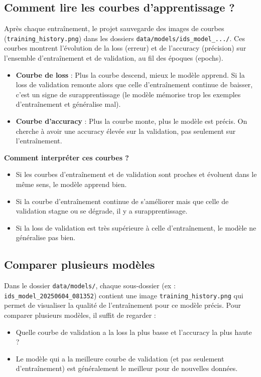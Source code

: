 \documentclass[a4paper,12pt]{article}
\begin{document}
\subsection{Comment lire les courbes d'apprentissage ?}
Après chaque entraînement, le projet sauvegarde des images de courbes (\texttt{training\_history.png}) dans les dossiers \texttt{data/models/ids\_model\_.../}. Ces courbes montrent l'évolution de la loss (erreur) et de l'accuracy (précision) sur l'ensemble d'entraînement et de validation, au fil des époques (epochs).

\begin{itemize}
  \item \textbf{Courbe de loss} : Plus la courbe descend, mieux le modèle apprend. Si la loss de validation remonte alors que celle d'entraînement continue de baisser, c'est un signe de surapprentissage (le modèle mémorise trop les exemples d'entraînement et généralise mal).
  \item \textbf{Courbe d'accuracy} : Plus la courbe monte, plus le modèle est précis. On cherche à avoir une accuracy élevée sur la validation, pas seulement sur l'entraînement.
\end{itemize}

\textbf{Comment interpréter ces courbes ?}
\begin{itemize}
  \item Si les courbes d'entraînement et de validation sont proches et évoluent dans le même sens, le modèle apprend bien.
  \item Si la courbe d'entraînement continue de s'améliorer mais que celle de validation stagne ou se dégrade, il y a surapprentissage.
  \item Si la loss de validation est très supérieure à celle d'entraînement, le modèle ne généralise pas bien.
\end{itemize}

\subsection{Comparer plusieurs modèles}
Dans le dossier \texttt{data/models/}, chaque sous-dossier (ex : \texttt{ids\_model\_20250604\_081352}) contient une image \texttt{training\_history.png} qui permet de visualiser la qualité de l'entraînement pour ce modèle précis. Pour comparer plusieurs modèles, il suffit de regarder :
\begin{itemize}
  \item Quelle courbe de validation a la loss la plus basse et l'accuracy la plus haute ?
  \item Le modèle qui a la meilleure courbe de validation (et pas seulement d'entraînement) est généralement le meilleur pour de nouvelles données.
\end{itemize}
\end{document}

